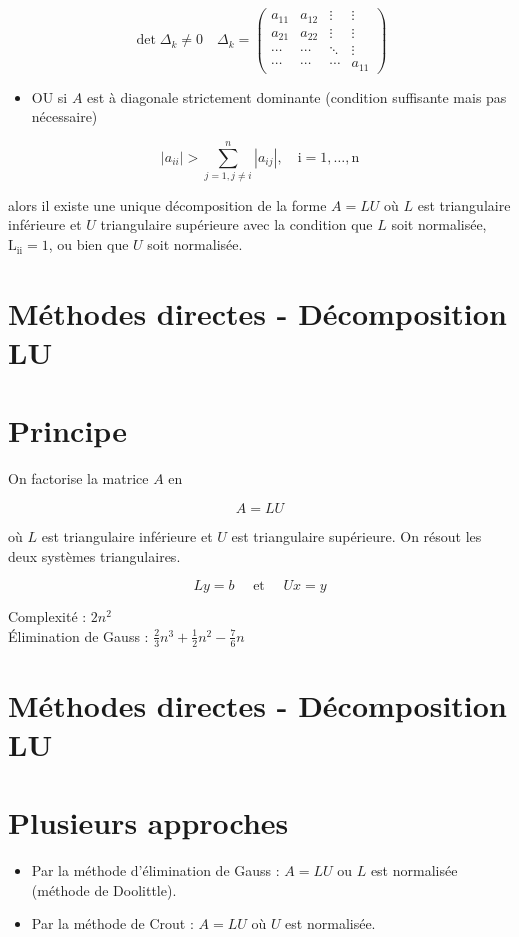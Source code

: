 \documentclass[10pt]{article}
\begin{document}
\[
\operatorname{det} \Delta_{k} \neq 0 \quad \Delta_{k}=\left(\begin{array}{cccc}
a_{11} & a_{12} & \vdots & \vdots \\
a_{21} & a_{22} & \vdots & \vdots \\
\cdots & \cdots & \ddots & \vdots \\
\cdots & \cdots & \cdots & a_{11}
\end{array}\right)
\]

\begin{itemize}
  \item OU si \(A\) est à diagonale strictement dominante (condition suffisante mais pas nécessaire)
\end{itemize}

\[
\left|a_{i i}\right|>\sum_{j=1, j \neq i}^{n}\left|a_{i j}\right|, \quad \mathrm{i}=1, \ldots, \mathrm{n}
\]

alors il existe une unique décomposition de la forme \(A=L U\) où \(L\) est triangulaire inférieure et \(U\) triangulaire supérieure avec la condition que \(L\) soit normalisée, \(\mathrm{L}_{\mathrm{ii}}=1\), ou bien que \(U\) soit normalisée.

\section*{Méthodes directes - Décomposition LU}
\section*{Principe}
On factorise la matrice \(A\) en

\[
A=L U
\]

où \(L\) est triangulaire inférieure et \(U\) est triangulaire supérieure. On résout les deux systèmes triangulaires.

\[
L y=b \quad \text { et } \quad U x=y
\]

Complexité : \(2 n^{2}\)\\
Élimination de Gauss : \(\frac{2}{3} n^{3}+\frac{1}{2} n^{2}-\frac{7}{6} n\)

\section*{Méthodes directes - Décomposition LU}
\section*{Plusieurs approches}
\begin{itemize}
  \item Par la méthode d'élimination de Gauss : \(A=L U\) ou \(L\) est normalisée (méthode de Doolittle).
  \item Par la méthode de Crout : \(A=L U\) où \(U\) est normalisée.
\end{itemize}
\end{document}
